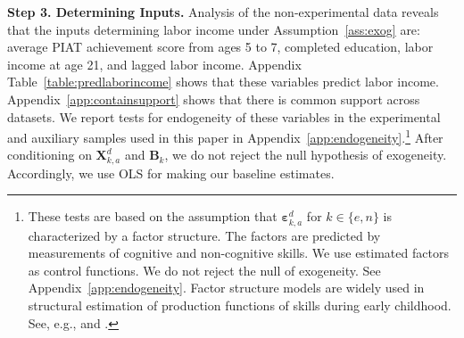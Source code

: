\textbf{Step 3. Determining Inputs.} Analysis of the non-experimental data reveals that the inputs determining labor income under Assumption~\ref{ass:exog} are: average PIAT achievement score from ages 5 to 7, completed education, labor income at age 21, and lagged labor income. Appendix Table~\ref{table:predlaborincome} shows that these variables predict labor income. Appendix~\ref{app:containsupport} shows that there is common support across datasets. We report tests for endogeneity of these variables in the experimental and auxiliary samples used in this paper in Appendix~\ref{app:endogeneity}.\footnote{These tests are based on the assumption that $\bm{\varepsilon}_{k,a}^d$ for $k \in \{e,n\}$ is characterized by a factor structure. The factors are predicted by measurements of cognitive and non-cognitive skills. We use estimated factors as control functions. We do not reject the null of exogeneity. See Appendix~\ref{app:endogeneity}. Factor structure models are widely used in structural estimation of production functions of skills during early childhood. See, e.g., \citet{Cunha_Heckman_2008_JHR} and \citet{Cunha_Heckman_etal_2010_est_tech_cognoncog}.} After conditioning on $\bm{X}_{k,a}^d$ and $\bm{B}_{k}$, we do not reject the null hypothesis of exogeneity. Accordingly, we use OLS for making our baseline estimates.


